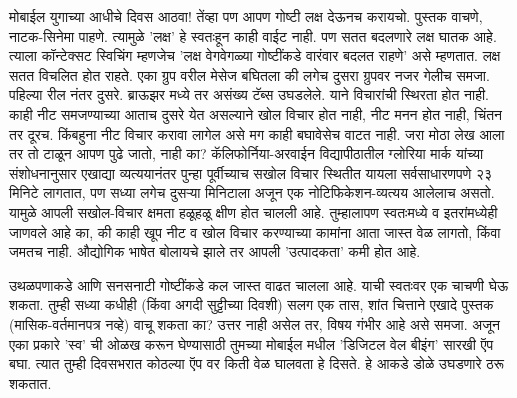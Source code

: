 मोबाईल युगाच्या आधीचे दिवस आठवा! तेंव्हा पण आपण गोष्टी लक्ष देऊनच करायचो. पुस्तक वाचणे, नाटक-सिनेमा पाहणे. त्यामुळे 'लक्ष' हे स्वतःहून काही वाईट नाही. पण सतत बदलणारे लक्ष घातक आहे. त्याला कॉन्टेक्सट स्विचिंग म्हणजेच 'लक्ष वेगवेगळ्या गोष्टींकडे वारंवार बदलत राहणे' असे म्हणतात. लक्ष सतत विचलित होत राहते. एका ग्रुप वरील मेसेज बघितला की लगेच दुसरा ग्रुपवर नजर गेलीच समजा. पहिल्या रील नंतर दुसरे. ब्राऊझर मध्ये तर असंख्य टॅब्स उघडलेले. याने विचारांची स्थिरता होत नाही. काही नीट समजण्याच्या आताच दुसरे येत असल्याने खोल विचार होत नाही, नीट मनन होत नाही, चिंतन तर दूरच. किंबहुना नीट विचार करावा लागेल असे मग काही बघावेसेच वाटत नाही. जरा मोठा लेख आला तर तो टाळून आपण पुढे जातो, नाही का? कॅलिफोर्निया-अरवाईन विद्यापीठातील ग्लोरिया मार्क यांच्या संशोधनानुसार एखाद्या व्यत्ययानंतर पुन्हा पूर्वीच्याच सखोल विचार स्थितीत यायला सर्वसाधारणपणे २३ मिनिटे लागतात, पण सध्या लगेच दुसऱ्या मिनिटाला अजून एक नोटिफिकेशन-व्यत्यय आलेलाच असतो. यामुळे आपली सखोल-विचार क्षमता हळूहळू क्षीण होत चालली आहे. तुम्हालापण स्वतःमध्ये व इतरांमध्येही जाणवले आहे का, की काही खूप नीट व खोल विचार करण्याच्या कामांना आता जास्त वेळ लागतो, किंवा जमतच नाही. औद्योगिक भाषेत बोलायचे झाले तर आपली 'उत्पादकता' कमी होत आहे.

उथळपणाकडे आणि सनसनाटी गोष्टींकडे कल जास्त वाढत चालला आहे. याची स्वतःवर एक चाचणी घेऊ शकता. तुम्ही सध्या कधीही (किंवा अगदी सुट्टीच्या दिवशी) सलग एक तास, शांत चित्ताने एखादे पुस्तक (मासिक-वर्तमानपत्र नव्हे) वाचू शकता का? उत्तर नाही असेल तर, विषय गंभीर आहे असे समजा. अजून एका प्रकारे 'स्व' ची ओळख करून घेण्यासाठी तुमच्या मोबाईल मधील 'डिजिटल वेल बीइंग' सारखी ऍप बघा. त्यात तुम्ही दिवसभरात कोठल्या ऍप वर किती वेळ घालवता हे दिसते. हे आकडे डोळे उघडणारे ठरू शकतात.

